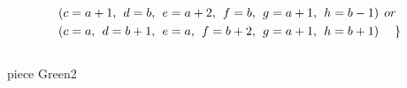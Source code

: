 \begin{align*}
&(c = a+1,\hspace{1ex}d = b,\hspace{1ex}e = a+2, \hspace{1ex}f = b,\hspace{1ex}g=a+1,\hspace{1ex}h=b-1)\hspace{1ex} or\\
&(c = a,\hspace{1ex}d = b+1,\hspace{1ex}e = a, \hspace{1ex}f = b+2,\hspace{1ex}g=a+1,\hspace{1ex}h=b+1)\hspace{3ex} \}
\end{align*}
\\ piece Green2 
